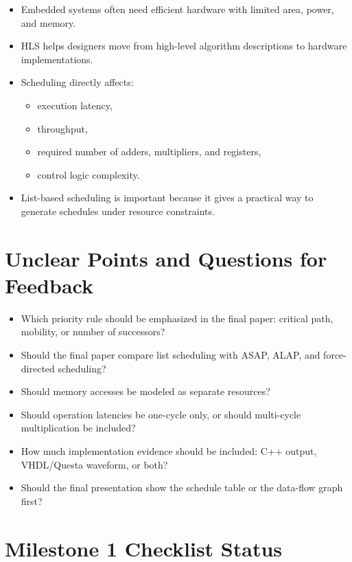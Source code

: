 \documentclass[11pt,a4paper]{article}
\begin{document}
\begin{itemize}[leftmargin=*]
    \item Embedded systems often need efficient hardware with limited area, power, and memory.
    \item HLS helps designers move from high-level algorithm descriptions to hardware implementations.
    \item Scheduling directly affects:
    \begin{itemize}
        \item execution latency,
        \item throughput,
        \item required number of adders, multipliers, and registers,
        \item control logic complexity.
    \end{itemize}
    \item List-based scheduling is important because it gives a practical way to generate schedules under resource constraints.
\end{itemize}

\section{Unclear Points and Questions for Feedback}

\begin{itemize}[leftmargin=*]
    \item Which priority rule should be emphasized in the final paper: critical path, mobility, or number of successors?
    \item Should the final paper compare list scheduling with ASAP, ALAP, and force-directed scheduling?
    \item Should memory accesses be modeled as separate resources?
    \item Should operation latencies be one-cycle only, or should multi-cycle multiplication be included?
    \item How much implementation evidence should be included: C++ output, VHDL/Questa waveform, or both?
    \item Should the final presentation show the schedule table or the data-flow graph first?
\end{itemize}

\section{Milestone 1 Checklist Status}
\end{document}
